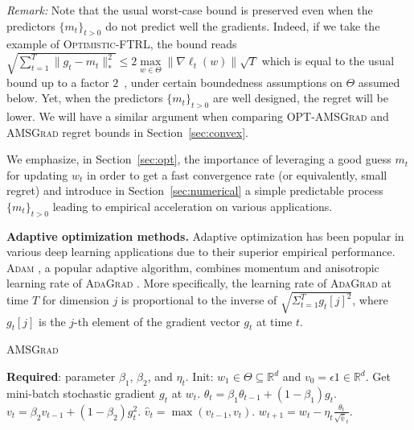 \documentclass[twoside]{article}
\begin{document}
\textit{Remark:} Note that the usual worst-case bound is preserved even when the predictors $\{m_{t}\}_{t>0}$ do not predict well the gradients. Indeed, if we take the example of \textsc{Optimistic-FTRL}, the bound reads $\sqrt{\sum_{t=1}^T \| g_t - m_t \|_*^2 } \leq 2 \max \limits_{w \in \Theta} \| \nabla \ell_t(w) \| \sqrt{T}$ which is equal to the usual bound up to a factor $2$~\citep{RS13b}, under certain boundedness assumptions on $\Theta$ assumed below.
Yet, when the predictors $\{m_{t}\}_{t>0}$ are well designed, the regret will be lower. 
We will have a similar argument when comparing \textsc{OPT-AMSGrad} and \textsc{AMSGrad} regret bounds in Section~\ref{sec:convex}.

We emphasize, in Section~\ref{sec:opt}, the importance of leveraging a good guess $m_t$ for updating $w_t$ in order to get a fast convergence rate (or equivalently, small regret) and introduce in Section~\ref{sec:numerical} a simple predictable process $\{m_{t}\}_{t>0}$ leading to empirical acceleration on various applications.

\textbf{Adaptive optimization methods.}\hspace{0.1cm}
Adaptive optimization has been popular in various deep learning applications due to their superior empirical performance.
\textsc{Adam} \citep{KB15}, a popular adaptive algorithm, combines momentum \citep{P64} and anisotropic learning rate of \textsc{AdaGrad} \citep{DHS11}.
More specifically, the learning rate of \textsc{AdaGrad} at time $T$ for dimension $j$ is proportional to the inverse of $\sqrt{ \Sigma_{t=1}^T g_t[j]^2 }$, where $g_t[j]$ is the $j$-th element of the gradient vector $g_t$ at time $t$.


\begin{algorithm}[H]
\caption{\textsc{AMSGrad} \citep{RKK18}} \label{alg:amsgrad}
\begin{algorithmic}[1]
\small
\STATE \textbf{Required}: parameter $\beta_1$, $\beta_2$, and $\eta_t$. 
\STATE Init: $w_{1} \in \Theta \subseteq \mathbb R^d $ and $v_{0} = \epsilon 1 \in \mathbb R^{d}$.
\STATE Get mini-batch stochastic gradient $g_t$ at $w_t$.
\STATE $\theta_t = \beta_1 \theta_{t-1} + (1 - \beta_1) g_t$.
\STATE $v_t = \beta_2 v_{t-1} + (1 - \beta_2) g_t^2$. 
\STATE \label{line:maxop}$\hat{v}_t = \max( \hat{v}_{t-1} , v_t )$. 
\STATE $w_{t+1} = w_t - \eta_t \frac{\theta_t}{ \sqrt{\hat{v}}_t }$.
\ENDFOR
\end{algorithmic}
\end{algorithm}\vspace{-0.1in}
\end{document}
